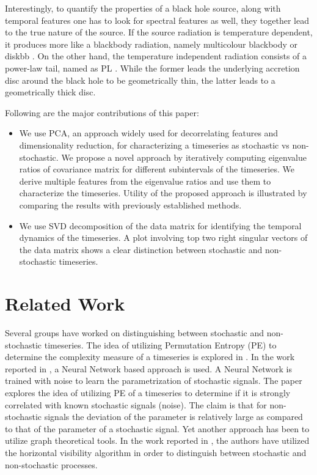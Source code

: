 \documentclass[10pt,conference]{IEEEtran}
\begin{document}
Interestingly, to quantify the properties of a black hole source, along with temporal features one has to look for spectral features as well, they together lead to the true nature of the source. If the source radiation is temperature dependent, it produces more like a blackbody radiation, namely multicolour blackbody or diskbb \cite{Shakura1973}. On the other hand, the temperature independent radiation consists of a power-law tail, named as PL \cite{chakrabarti1995,narayan1994}.
While the former leads the underlying accretion disc around the black hole to be geometrically thin, the latter leads to a geometrically thick disc.


Following are the major contributions of this paper:
\begin{itemize}
  \item We use PCA, an approach widely used for decorrelating features and dimensionality reduction, for characterizing a timeseries as stochastic vs non-stochastic. We propose a novel approach by iteratively computing eigenvalue ratios  of covariance matrix for different subintervals of the timeseries. We  derive multiple features from the eigenvalue ratios and use them to characterize the timeseries. Utility of the proposed approach is illustrated by comparing the results with previously established methods.
  \item We use SVD decomposition of the data matrix for identifying the temporal dynamics of the timeseries. A plot involving top two right singular vectors of the data matrix shows a clear distinction between stochastic and non-stochastic timeseries.
\end{itemize}
\section{Related Work}
Several groups have worked on distinguishing between stochastic and non-stochastic timeseries. The idea of utilizing Permutation Entropy (PE) to determine the complexity measure of a timeseries is explored in \cite{Bandt2002}. In the work reported in \cite{Boaretto2021}, a Neural Network based approach is used. A Neural Network is trained with noise to learn the parametrization of stochastic signals. The paper explores the idea of utilizing PE of a timeseries to determine if it is strongly correlated with known stochastic signals (noise).   The claim is that for non-stochastic signals the deviation of the parameter is relatively large as compared to that of the parameter of a stochastic signal.  Yet another approach has been to utilize graph theoretical tools. In the work reported in \cite{lacasa2010}, the authors have utilized the horizontal visibility algorithm in order to distinguish between stochastic and non-stochastic processes.
\end{document}
